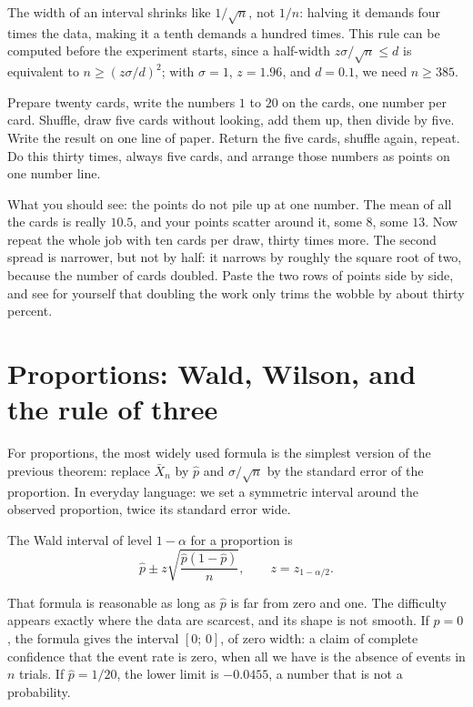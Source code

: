 The width of an interval shrinks like $1/\sqrt n$, not $1/n$: halving it demands four times
the data, making it a tenth demands a hundred times. This rule can be computed before the
experiment starts, since a half-width $z\sigma/\sqrt n\le d$ is equivalent
to $n\ge(z\sigma/d)^2$; with $\sigma=1$, $z=1.96$, and $d=0.1$, we need
$n\ge385$.

\begin{tangan}
Prepare twenty cards, write the numbers $1$ to $20$ on the cards, one number per card.
Shuffle, draw five cards without looking, add them up, then divide by five. Write the result on
one line of paper. Return the five cards, shuffle again, repeat. Do this thirty times, always
five cards, and arrange those numbers as points on one number line.

What you should see: the points do not pile up at one number. The mean of all the
cards is really $10.5$, and your points scatter around it, some $8$, some
$13$. Now repeat the whole job with ten cards per draw, thirty
times more. The second spread is narrower, but not by half: it narrows by roughly
the square root of two, because the number of cards doubled. Paste the two rows of points side
by side, and see for yourself that doubling the work only trims the wobble by about thirty
percent.
\end{tangan}

\section{Proportions: Wald, Wilson, and the rule of three}

For proportions, the most widely used formula is the simplest version of the previous
theorem: replace $\bar X_n$ by $\hat p$ and $\sigma/\sqrt n$ by the standard error of the
proportion. In everyday language: we set a symmetric interval around the observed proportion,
twice its standard error wide.

\begin{definisi}
The Wald interval of level $1-\alpha$ for a proportion is
\[
\hat p\pm z\sqrt{\frac{\hat p(1-\hat p)}{n}},\qquad z=z_{1-\alpha/2}.
\]
\end{definisi}

That formula is reasonable as long as $\hat p$ is far from zero and one. The difficulty
appears exactly where the data are scarcest, and its shape is not smooth. If $\hat p=0$, the
formula gives the interval $[0;\,0]$, of zero width: a claim of complete confidence that the
event rate is zero, when all we have is the absence of events in $n$ trials. If $\hat p=1/20$,
the lower limit is $-0.0455$, a number that is not a probability.

